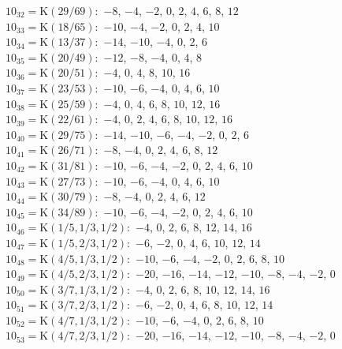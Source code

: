 $10_{32} = \mathrm{K}(29/69):$  $-8$, $-4$, $-2$, $0$, $2$, $4$, $6$, $8$, $12$\\ 
$10_{33} = \mathrm{K}(18/65):$  $-10$, $-4$, $-2$, $0$, $2$, $4$, $10$\\ 
$10_{34} = \mathrm{K}(13/37):$  $-14$, $-10$, $-4$, $0$, $2$, $6$\\ 
$10_{35} = \mathrm{K}(20/49):$  $-12$, $-8$, $-4$, $0$, $4$, $8$\\ 
$10_{36} = \mathrm{K}(20/51):$  $-4$, $0$, $4$, $8$, $10$, $16$\\ 
$10_{37} = \mathrm{K}(23/53):$  $-10$, $-6$, $-4$, $0$, $4$, $6$, $10$\\ 
$10_{38} = \mathrm{K}(25/59):$  $-4$, $0$, $4$, $6$, $8$, $10$, $12$, $16$\\ 
$10_{39} = \mathrm{K}(22/61):$  $-4$, $0$, $2$, $4$, $6$, $8$, $10$, $12$, $16$\\ 
$10_{40} = \mathrm{K}(29/75):$  $-14$, $-10$, $-6$, $-4$, $-2$, $0$, $2$, $6$\\ 
$10_{41} = \mathrm{K}(26/71):$  $-8$, $-4$, $0$, $2$, $4$, $6$, $8$, $12$\\ 
$10_{42} = \mathrm{K}(31/81):$  $-10$, $-6$, $-4$, $-2$, $0$, $2$, $4$, $6$, $10$\\ 
$10_{43} = \mathrm{K}(27/73):$  $-10$, $-6$, $-4$, $0$, $4$, $6$, $10$\\ 
$10_{44} = \mathrm{K}(30/79):$  $-8$, $-4$, $0$, $2$, $4$, $6$, $12$\\ 
$10_{45} = \mathrm{K}(34/89):$  $-10$, $-6$, $-4$, $-2$, $0$, $2$, $4$, $6$, $10$\\ 
$10_{46} = \mathrm{K}(1/5, 1/3, 1/2):$  $-4$, $0$, $2$, $6$, $8$, $12$, $14$, $16$\\ 
$10_{47} = \mathrm{K}(1/5, 2/3, 1/2):$  $-6$, $-2$, $0$, $4$, $6$, $10$, $12$, $14$\\ 
$10_{48} = \mathrm{K}(4/5, 1/3, 1/2):$  $-10$, $-6$, $-4$, $-2$, $0$, $2$, $6$, $8$, $10$\\ 
$10_{49} = \mathrm{K}(4/5, 2/3, 1/2):$  $-20$, $-16$, $-14$, $-12$, $-10$, $-8$, $-4$, $-2$, $0$\\ 
$10_{50} = \mathrm{K}(3/7, 1/3, 1/2):$  $-4$, $0$, $2$, $6$, $8$, $10$, $12$, $14$, $16$\\ 
$10_{51} = \mathrm{K}(3/7, 2/3, 1/2):$  $-6$, $-2$, $0$, $4$, $6$, $8$, $10$, $12$, $14$\\ 
$10_{52} = \mathrm{K}(4/7, 1/3, 1/2):$  $-10$, $-6$, $-4$, $0$, $2$, $6$, $8$, $10$\\ 
$10_{53} = \mathrm{K}(4/7, 2/3, 1/2):$  $-20$, $-16$, $-14$, $-12$, $-10$, $-8$, $-4$, $-2$, $0$\\ 
